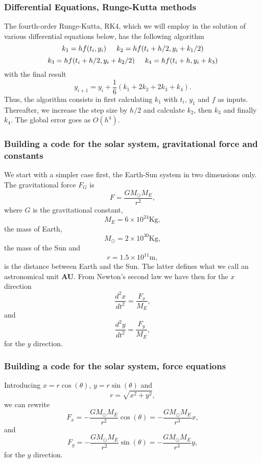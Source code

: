 \documentclass{beamer}
\begin{document}
\begin{frame}
\frametitle{Differential Equations, Runge-Kutta methods}

\begin{block}{}
The fourth-order Runge-Kutta, RK4, which we will employ in the solution of various differential equations below, has the following algorithm
\[
  k_1=hf(t_i,y_i) \hspace{0.5cm}   k_2=hf(t_i+h/2,y_i+k_1/2)
\]
\[
  k_3=hf(t_i+h/2,y_i+k_2/2)\hspace{0.5cm}   k_4=hf(t_i+h,y_i+k_3)
\]
with the final result
\[
  y_{i+1}=y_i +\frac{1}{6}\left( k_1 +2k_2+2k_3+k_4\right).
\]
Thus, the algorithm consists in first calculating $k_1$ 
with $t_i$, $y_1$ and $f$ as inputs. Thereafter, we increase the step
size by $h/2$ and calculate $k_2$, then $k_3$ and finally $k_4$. The global error goes as $O(h^4)$.
\end{block}
\end{frame}

\begin{frame}
\frametitle{Building a code for the solar system, gravitational force and constants}

\begin{block}{}
We start with a simpler case first, the Earth-Sun system  in two dimensions only.  The gravitational force $F_G$ is  
  \[
      F=\frac{GM_{\odot}M_E}{r^2},
  \]
where $G$ is the gravitational constant, 
\[
M_E=6\times 10^{24}\mathrm{Kg},
\]
the mass of Earth, 
\[
M_{\odot}=2\times 10^{30}\mathrm{Kg}, 
\]
the mass of the Sun and 
\[
r=1.5\times 10^{11}\mathrm{m}, 
\]
is the distance between Earth and the Sun. The latter defines what we call an astronomical unit \textbf{AU}.
From Newton's second law we have then for the $x$ direction
  \[
   \frac{d^2x}{dt^2}=\frac{F_{x}}{M_E},
  \]
and
  \[
   \frac{d^2y}{dt^2}=\frac{F_{y}}{M_E},
  \]
for the $y$ direction.
\end{block}
\end{frame}

\begin{frame}
\frametitle{Building a code for the solar system, force equations}

\begin{block}{}
Introducing $x=r\cos{(\theta)}$, $y=r\sin{(\theta)}$ and
\[
r = \sqrt{x^2+y^2},
\]
we can rewrite 
  \[
   F_{x}=-\frac{GM_{\odot}M_E}{r^2}\cos{(\theta)}=-\frac{GM_{\odot}M_E}{r^3}x,
  \]
and
  \[
     F_{y}=-\frac{GM_{\odot}M_E}{r^2}\sin{(\theta)}=-\frac{GM_{\odot}M_E}{r^3}y,
  \]
for the $y$ direction.
\end{block}
\end{frame}
\end{document}

